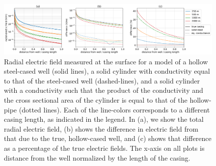 \begin{figure}
    \begin{center}
    \includegraphics[width=\textwidth]{figures/approximating_wells_electric_fields.png}
    \end{center}
\caption{
    Radial electric field measured at the surface for a model of
    a hollow steel-cased well (solid lines), a solid cylinder with
    conductivity equal to that of the steel-cased well (dashed-lines),
    and a solid cylinder with a conductivity such that the product of the
    conductivity and the cross sectional area of the cylinder is equal to that
    of the hollow-pipe (dotted lines). Each of the line-colors corresponds to a
    different casing length, as indicated in the legend.
    In (a), we show the total radial electric field,
    (b) shows the difference in electric field from that due to the true, hollow-cased well,
    and (c) shows that difference as a percentage
    of the true electric fields.
    The x-axis on all plots is distance from the well normalized by the length of the casing.
}
\label{fig:approximating_wells_electric_fields}
\end{figure}
